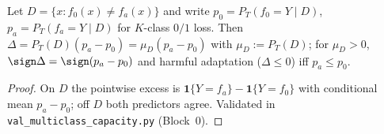 \begin{proposition}\label{thm:disagree-mc}
Let $D=\{x:f_0(x)\neq f_a(x)\}$ and write $p_0=P_T(f_0{=}Y\mid D)$, $p_a=P_T(f_a{=}Y\mid D)$
for $K$-class $0/1$ loss. Then
$\Delta=P_T(D)(p_a-p_0)=\mu_D(p_a-p_0)$ with $\mu_D:=P_T(D)$; for $\mu_D>0$,
$\sign\Delta=\sign(p_a-p_0)$ and harmful adaptation ($\Delta\le0$) iff $p_a\le p_0$.
\end{proposition}
\begin{proof}
On $D$ the pointwise excess is $\mathbf 1\{Y{=}f_a\}-\mathbf 1\{Y{=}f_0\}$ with conditional mean
$p_a-p_0$; off $D$ both predictors agree. Validated in \texttt{val\_multiclass\_capacity.py}
(Block~0).
\end{proof}
